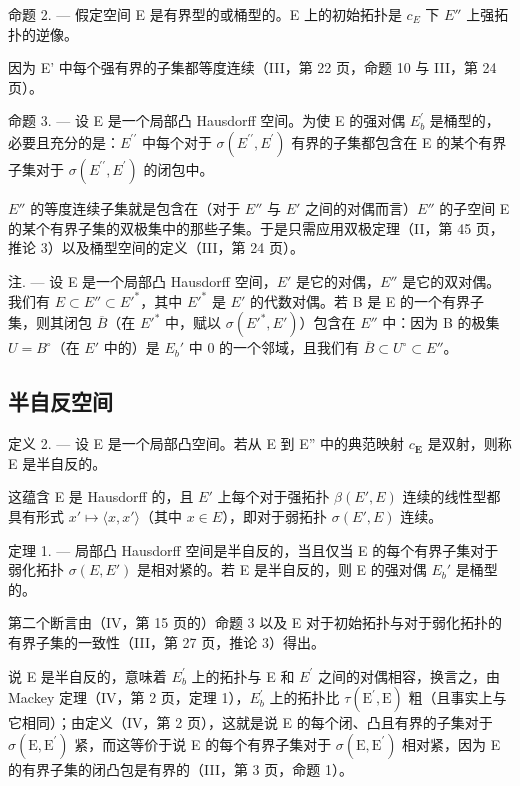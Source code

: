 命题 2. --- 假定空间 E 是有界型的或桶型的。E 上的初始拓扑是 \(c_{E}\) 下 \(E''\) 上强拓扑的逆像。

因为 E' 中每个强有界的子集都等度连续（III，第 22 页，命题 10 与 III，第 24 页）。

命题 3. --- 设 E 是一个局部凸 Hausdorff 空间。为使 E 的强对偶 \(E_{b}^{\prime}\) 是桶型的，必要且充分的是：\(E^{\prime\prime}\) 中每个对于 \(\sigma(E^{\prime\prime}, E^{\prime})\) 有界的子集都包含在 E 的某个有界子集对于 \(\sigma(E^{\prime\prime}, E^{\prime})\) 的闭包中。

\(E''\) 的等度连续子集就是包含在（对于 \(E''\) 与 \(E'\) 之间的对偶而言）\(E''\) 的子空间 E 的某个有界子集的双极集中的那些子集。于是只需应用双极定理（II，第 45 页，推论 3）以及桶型空间的定义（III，第 24 页）。

注. --- 设 E 是一个局部凸 Hausdorff 空间，\(E'\) 是它的对偶，\(E''\) 是它的双对偶。我们有 \(E \subset E'' \subset E'^{*}\)，其中 \(E'^{*}\) 是 \(E'\) 的代数对偶。若 B 是 E 的一个有界子集，则其闭包 \(\overline{B}\)（在 \(E'^{*}\) 中，赋以 \(\sigma(E'^{*}, E')\)）包含在 \(E''\) 中：因为 B 的极集 \(U = B^{\circ}\)（在 \(E'\) 中的）是 \(E_b'\) 中 0 的一个邻域，且我们有 \(\overline{B} \subset U^{\circ} \subset E''\)。

\subsection{半自反空间}

定义 2. --- 设 E 是一个局部凸空间。若从 E 到 E'' 中的典范映射 \(c_{\mathbf{E}}\) 是双射，则称 E 是半自反的。

这蕴含 E 是 Hausdorff 的，且 \(E'\) 上每个对于强拓扑 \(\beta(E', E)\) 连续的线性型都具有形式 \(x' \mapsto \langle x, x' \rangle\)（其中 \(x \in E\)），即对于弱拓扑 \(\sigma(E', E)\) 连续。

定理 1. --- 局部凸 Hausdorff 空间是半自反的，当且仅当 E 的每个有界子集对于弱化拓扑 \(\sigma(E, E')\) 是相对紧的。若 E 是半自反的，则 E 的强对偶 \(E_b'\) 是桶型的。

第二个断言由（IV，第 15 页的）命题 3 以及 E 对于初始拓扑与对于弱化拓扑的有界子集的一致性（III，第 27 页，推论 3）得出。

说 E 是半自反的，意味着 \(E_{b}^{\prime}\) 上的拓扑与 E 和 \(E^{\prime}\) 之间的对偶相容，换言之，由 Mackey 定理（IV，第 2 页，定理 1），\(E_{b}^{\prime}\) 上的拓扑比 \(\tau(\mathrm{E}^{\prime}, \mathrm{E})\) 粗（且事实上与它相同）；由定义（IV，第 2 页），这就是说 E 的每个闭、凸且有界的子集对于 \(\sigma(\mathrm{E}, \mathrm{E}^{\prime})\) 紧，而这等价于说 E 的每个有界子集对于 \(\sigma(\mathrm{E},\mathrm{E}^{\prime})\) 相对紧，因为 E 的有界子集的闭凸包是有界的（III，第 3 页，命题 1）。

